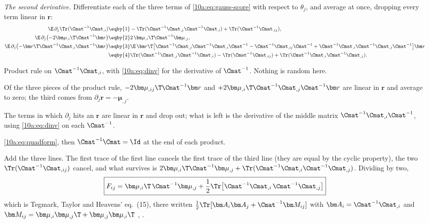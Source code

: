 \emph{The second derivative.} Differentiate each of the three terms of \eqref{10a:eq:gauss-score} with respect
to $\theta_j$, and average at once, dropping every term linear in $\bm r$:
\begin{align}
  \E\,\partial_j\Tr(\Cmat^{-1}\Cmat_{,i})
  &\eqby{1}-\Tr(\Cmat^{-1}\Cmat_{,j}\Cmat^{-1}\Cmat_{,i})+\Tr(\Cmat^{-1}\Cmat_{,ij}),
  \nonumber\\
  \E\,\partial_j\bigl(-2\bm\mu_{,i}\T\Cmat^{-1}\bm r\bigr)
  &\eqby{2}2\,\bm\mu_{,i}\T\Cmat^{-1}\bm\mu_{,j},
  \nonumber\\
  \E\,\partial_j\bigl(-\bm r\T\Cmat^{-1}\Cmat_{,i}\Cmat^{-1}\bm r\bigr)
  &\eqby{3}\E\,\bm r\T\bigl[\Cmat^{-1}\Cmat_{,j}\Cmat^{-1}\Cmat_{,i}\Cmat^{-1}-\Cmat^{-1}\Cmat_{,ij}\Cmat^{-1}
   +\Cmat^{-1}\Cmat_{,i}\Cmat^{-1}\Cmat_{,j}\Cmat^{-1}\bigr]\bm r
  \nonumber\\
  &\eqby{4}\Tr(\Cmat^{-1}\Cmat_{,j}\Cmat^{-1}\Cmat_{,i})-\Tr(\Cmat^{-1}\Cmat_{,ij})+\Tr(\Cmat^{-1}\Cmat_{,i}\Cmat^{-1}\Cmat_{,j}).
  \label{10a:eq:gauss-hess}
\end{align}
\begin{explain}
  \item Product rule on $\Cmat^{-1}\Cmat_{,i}$, with \eqref{10a:eq:dinv} for the derivative of $\Cmat^{-1}$. Nothing
        is random here.
  \item Of the three pieces of the product rule, $-2\bm\mu_{,ij}\T\Cmat^{-1}\bm r$ and
        $+2\bm\mu_{,i}\T\Cmat^{-1}\Cmat_{,j}\Cmat^{-1}\bm r$ are linear in $\bm r$ and average to zero; the third comes
        from $\partial_j\bm r=-\bm\mu_{,j}$.
  \item The terms in which $\partial_j$ hits an $\bm r$ are linear in $\bm r$ and drop out; what is left is the
        derivative of the middle matrix $\Cmat^{-1}\Cmat_{,i}\Cmat^{-1}$, using \eqref{10a:eq:dinv} on each $\Cmat^{-1}$.
  \item \eqref{10a:eq:quadform}, then $\Cmat^{-1}\Cmat=\Id$ at the end of each product.
\end{explain}
Add the three lines. The first trace of the first line cancels the first trace of the third line (they are equal by the
cyclic property), the two $\Tr(\Cmat^{-1}\Cmat_{,ij})$ cancel, and what survives is
$2\bm\mu_{,i}\T\Cmat^{-1}\bm\mu_{,j}+\Tr(\Cmat^{-1}\Cmat_{,i}\Cmat^{-1}\Cmat_{,j})$. Dividing by two,
\begin{equation}
  \boxed{F_{ij}=\bm\mu_{,i}\T\,\Cmat^{-1}\bm\mu_{,j}+\frac12\Tr\bigl[\Cmat^{-1}\Cmat_{,i}\,\Cmat^{-1}\Cmat_{,j}\bigr]}
  \label{10a:eq:gauss-fisher}
\end{equation}
which is Tegmark, Taylor and Heavens' eq.~(15), there written $\frac12\Tr[\bm A_i\bm A_j+\Cmat^{-1}\bm M_{ij}]$ with
$\bm A_i=\Cmat^{-1}\Cmat_{,i}$ and $\bm M_{ij}=\bm\mu_{,i}\bm\mu_{,j}\T+\bm\mu_{,j}\bm\mu_{,i}\T$ \cite{TTH1997},
.

